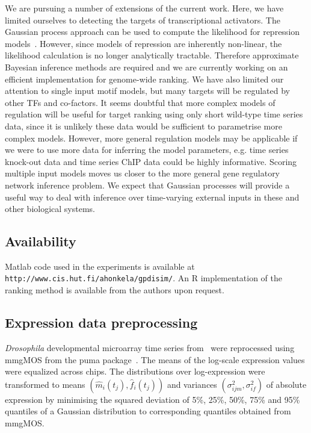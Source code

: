 \documentclass{pnastwo}
\begin{document}
\begin{article}
We are pursuing a number of extensions of the current work. Here, we
have limited ourselves to detecting the targets of transcriptional activators. The
Gaussian process approach can be used to compute the likelihood for
repression models~\cite{Gao2008}. However, since models of repression
are inherently non-linear, the likelihood calculation is no longer analytically
tractable. Therefore approximate Bayesian inference methods are
required and we are currently working on an efficient implementation
for genome-wide ranking. We have also limited our attention
to single input motif models, but many targets will be regulated by other TFs and
co-factors. It seems doubtful that more complex models of regulation
will be useful for target ranking using only short wild-type time
series data, since it is unlikely these data would be sufficient to parametrise more complex models. However,
more general regulation models may be applicable if we were to use more data for
inferring the model parameters, e.g. time series knock-out data and time series
ChIP data could be highly informative. Scoring multiple input
models moves us closer to the more general gene regulatory network inference
problem. We expect that Gaussian processes will provide a useful way
to deal with inference over time-varying external inputs in these and other
biological systems.

\subsection{Availability}
Matlab code used in the experiments is available at
\texttt{http://www.cis.hut.fi/ahonkela/gpdisim/}.  An R implementation of
the ranking method is available from the authors upon request.

\begin{materials}
  \section{Expression data preprocessing} \emph{Drosophila} developmental
  microarray time series from~\cite{Tomancak2002} were reprocessed
  using mmgMOS from the puma package~\cite{Pearson2009}.  The means of
  the log-scale expression values were equalized across chips.  The
  distributions over log-expression were transformed to means
  $\left(\hat{m}_i(t_j), \hat{f}_i(t_j)\right)$ and variances $\left(\sigma_{ijm}^2,
  \sigma_{if}^2 \right)$ of absolute expression by minimising the squared
  deviation of 5\%, 25\%, 50\%, 75\% and 95\% quantiles of a Gaussian
  distribution to corresponding quantiles obtained from mmgMOS.


\end{materials}
\end{article}
\end{document}
